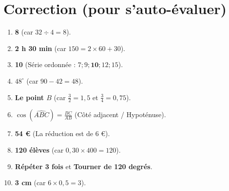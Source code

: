 \documentclass[10pt,a4paper]{article}
\begin{document}
\section*{Correction (pour s'auto-évaluer)}

\begin{enumerate}
    \item \textbf{8} (car $32 \div 4 = 8$). 
    \item \textbf{2 h 30 min} (car $150 = 2 \times 60 + 30$). 
    \item \textbf{10} (Série ordonnée : $7 ; 9 ; \mathbf{10} ; 12 ; 15$). 
    \item \textbf{$48^\circ$} (car $90 - 42 = 48$). 
    \item \textbf{Le point $B$} (car $\frac{3}{2} = 1,5$ et $\frac{3}{4} = 0,75$). 
    \item \textbf{$\cos(\widehat{ABC}) = \frac{BC}{AB}$} (Côté adjacent / Hypoténuse).
    \item \textbf{54 €} (La réduction est de 6 €). 
    \item \textbf{120 élèves} (car $0,30 \times 400 = 120$). 
    \item \textbf{Répéter 3 fois} et \textbf{Tourner de 120 degrés}. 
    \item \textbf{3 cm} (car $6 \times 0,5 = 3$). 
\end{enumerate}
\end{document}
